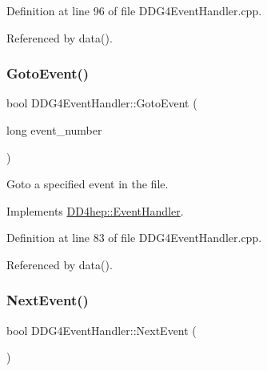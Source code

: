 Definition at line 96 of file D\+D\+G4\+Event\+Handler.\+cpp.



Referenced by data().

\hypertarget{class_d_d4hep_1_1_d_d_g4_event_handler_a3af4cf3191fabf450e81812e93d2502a}{}\label{class_d_d4hep_1_1_d_d_g4_event_handler_a3af4cf3191fabf450e81812e93d2502a} 
\subsubsection{\texorpdfstring{Goto\+Event()}{GotoEvent()}}
{\footnotesize\ttfamily bool D\+D\+G4\+Event\+Handler\+::\+Goto\+Event (\begin{DoxyParamCaption}\item[{long}]{event\+\_\+number }\end{DoxyParamCaption})\hspace{0.3cm}{\ttfamily [virtual]}}



Goto a specified event in the file. 



Implements \hyperlink{class_d_d4hep_1_1_event_handler_a09c40b0b753455c1e3df7c561ff6b069}{D\+D4hep\+::\+Event\+Handler}.



Definition at line 83 of file D\+D\+G4\+Event\+Handler.\+cpp.



Referenced by data().

\hypertarget{class_d_d4hep_1_1_d_d_g4_event_handler_a02ecd0dfced58988ab84242cb9fdfd44}{}\label{class_d_d4hep_1_1_d_d_g4_event_handler_a02ecd0dfced58988ab84242cb9fdfd44} 
\subsubsection{\texorpdfstring{Next\+Event()}{NextEvent()}}
{\footnotesize\ttfamily bool D\+D\+G4\+Event\+Handler\+::\+Next\+Event (\begin{DoxyParamCaption}{ }\end{DoxyParamCaption})\hspace{0.3cm}{\ttfamily [virtual]}}



